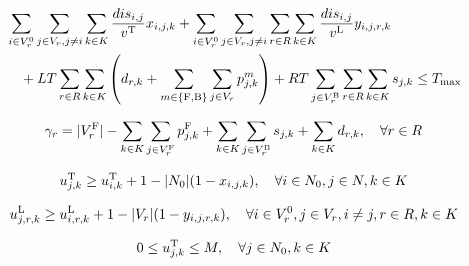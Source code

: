 \begin{linenomath}
    \begin{equation}
        \begin{split}
            &\sum_{i \in V^0_r} \sum_{j \in V_r, j \neq i}\sum_{k \in K} \frac{dis_{i,j}}{v^{\text{T}}} x_{i,j,k} + \sum_{i \in V^0_r} \sum_{j \in V_r, j \neq i}\sum_{r \in R}\sum_{k \in K} \frac{dis_{i,j}}{v^{\text{L}}} y_{i,j,r,k} \\
            &\quad + LT \sum_{r \in R}\sum_{k \in K}\left(d_{r,k} + \sum_{m \in \{\text{F},\text{B}\}}\sum_{j \in V_r}p^m_{j,k}\right) + RT \sum_{j \in V_r^{\text{B}}}\sum_{r \in R}\sum_{k \in K}s_{j,k} \leq T_{\max}
        \end{split}
        \label{eq:time_budget}
    \end{equation}
\end{linenomath}

\begin{linenomath}
    \begin{equation}
        \gamma_r = |V_r^{\text{F}}| - \sum_{k \in K}\sum_{j \in V_r^{\text{F}}} p^{\text{F}}_{j,k} + \sum_{k \in K}\sum_{j \in V_r^{\text{B}}} s_{j,k} + \sum_{k \in K} d_{r,k}, \quad \forall r \in R \label{eq:regional_inventory}
    \end{equation}
\end{linenomath}

\begin{linenomath}
    \begin{equation}
        u_{j,k}^{\text{T}} \geq u_{i,k}^{\text{T}} + 1 - |N_0|(1 - x_{i,j,k}), \quad \forall i \in N_0, j \in N, k \in K \label{eq:truck_subtour}
    \end{equation}
\end{linenomath}

\begin{linenomath}
    \begin{equation}
        u_{j,r,k}^{\text{L}} \geq u_{i,r,k}^{\text{L}} + 1 - |V_r|(1 - y_{i,j,r,k}), \quad \forall i \in V^0_r, j \in V_r, i \neq j, r \in R, k \in K \label{eq:laborer_subtour}
    \end{equation}
\end{linenomath}

\begin{linenomath}
    \begin{equation}
        0 \leq u_{j,k}^{\text{T}} \leq M, \quad \forall j \in N_0, k \in K \label{eq:truck_aux_bounds}
    \end{equation}
\end{linenomath}

